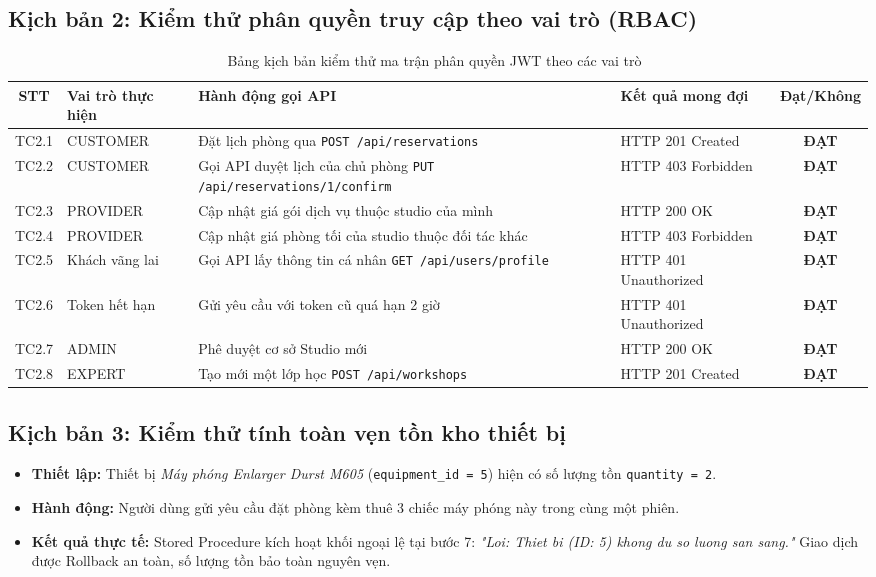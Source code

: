\subsection{Kịch bản 2: Kiểm thử phân quyền truy cập theo vai trò (RBAC)}

\begin{table}[H]
\centering
\small
\caption{Bảng kịch bản kiểm thử ma trận phân quyền JWT theo các vai trò~\cite{nugraha2023performance, sandhu2023role}}
\label{tab:tc_rbac}
\begin{tabularx}{\textwidth}{c p{3.2cm} p{3.8cm} p{3.2cm} c}
\toprule
\textbf{STT} & \textbf{Vai trò thực hiện} & \textbf{Hành động gọi API} & \textbf{Kết quả mong đợi} & \textbf{Đạt/Không} \\
\midrule
TC2.1 & CUSTOMER & Đặt lịch phòng qua \texttt{POST /api/reservations} & HTTP 201 Created & \textbf{ĐẠT} \\
TC2.2 & CUSTOMER & Gọi API duyệt lịch của chủ phòng \texttt{PUT /api/reservations/1/confirm} & HTTP 403 Forbidden & \textbf{ĐẠT} \\
TC2.3 & PROVIDER & Cập nhật giá gói dịch vụ thuộc studio của mình & HTTP 200 OK & \textbf{ĐẠT} \\
TC2.4 & PROVIDER & Cập nhật giá phòng tối của studio thuộc đối tác khác & HTTP 403 Forbidden & \textbf{ĐẠT} \\
TC2.5 & Khách vãng lai & Gọi API lấy thông tin cá nhân \texttt{GET /api/users/profile} & HTTP 401 Unauthorized & \textbf{ĐẠT} \\
TC2.6 & Token hết hạn & Gửi yêu cầu với token cũ quá hạn 2 giờ & HTTP 401 Unauthorized & \textbf{ĐẠT} \\
TC2.7 & ADMIN & Phê duyệt cơ sở Studio mới & HTTP 200 OK & \textbf{ĐẠT} \\
TC2.8 & EXPERT & Tạo mới một lớp học \texttt{POST /api/workshops} & HTTP 201 Created & \textbf{ĐẠT} \\
\bottomrule
\end{tabularx}
\end{table}

\subsection{Kịch bản 3: Kiểm thử tính toàn vẹn tồn kho thiết bị}
\begin{itemize}[leftmargin=2em]
    \item \textbf{Thiết lập:} Thiết bị \textit{Máy phóng Enlarger Durst M605} (\texttt{equipment\_id = 5}) hiện có số lượng tồn \texttt{quantity = 2}.
    \item \textbf{Hành động:} Người dùng gửi yêu cầu đặt phòng kèm thuê 3 chiếc máy phóng này trong cùng một phiên.
    \item \textbf{Kết quả thực tế:} Stored Procedure kích hoạt khối ngoại lệ tại bước 7: \textit{"Loi: Thiet bi (ID: 5) khong du so luong san sang."} Giao dịch được Rollback an toàn, số lượng tồn bảo toàn nguyên vẹn.
\end{itemize}

